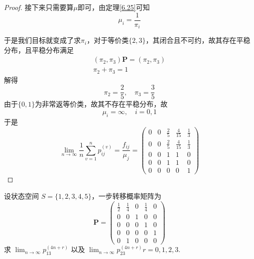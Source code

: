 \documentclass[lang=cn,10pt,thmcnt=section]{elegantbook}
\begin{document}
\begin{proof}
接下来只需要算$\mu$即可，由定理\ref{6.25}可知
\[
\mu_i = \frac{1}{\pi_i}
\]

于是我们目标就变成了求$\pi_i$，对于等价类$\{2,3\}$，其闭合且不可约，故其存在平稳分布，且平稳分布满足
\begin{equation*}
	\begin{split}
		(\pi_2,\pi_3)\mathbf{P} = (\pi_2,\pi_3)\\
		\pi_2 + \pi_3 = 1
	\end{split}
\end{equation*}
解得
\[
\pi_2 = \frac{2}{5}, \quad \pi_3 = \frac{3}{5}
\]
由于$\{0,1\}$为非常返等价类，故其不存在平稳分布，故
\[
\mu_i = \infty, \quad i = 0,1
\]
于是
\[
\lim_{n \to \infty} \frac{1}{n} \sum_{v=1}^{n} p_{ij}^{(v)} = \frac{f_{ij}}{\mu_j}=
 \begin{pmatrix}
	0& 0 & \frac{2}{5} & \frac{4}{15} & \frac{1}{3} \\
0 & 0 & \frac{2}{5} & \frac{4}{15} & \frac{1}{3} \\
0 & 0 & 1 & 1& 0 \\
0 & 0 & 1& 1& 0 \\
0 & 0 & 0 & 0 & 1
\end{pmatrix}
\]

\end{proof}
\begin{example}
	设状态空间 $S = \{1, 2, 3, 4, 5\}$，一步转移概率矩阵为
    \[
    \mathbf{P} = \begin{pmatrix}
    \frac{1}{2} & \frac{1}{4} & 0 & \frac{1}{4} & 0 \\
    0 & 0 & 1 & 0 & 0 \\
    0 & 0 & 0 & 1 & 0 \\
    0 & 0 & 0 & 0 & 1 \\
    0 & 1 & 0 & 0 & 0
    \end{pmatrix}
    \]
    求 $\lim_{n \to \infty} p_{13}^{(4n+r)}$ 以及 $\lim_{n \to \infty} p_{23}^{(4n+r)} r = 0, 1, 2, 3$.
\end{example}
\end{document}
